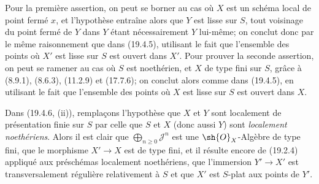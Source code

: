 Pour la première assertion, on peut se borner au cas où $X$ est un schéma local de point fermé $x$, et l'hypothèse entraîne alors que $Y$ est lisse sur $S$, tout voisinage du point fermé de $Y$ dans $Y$ étant nécessairement $Y$ lui-même; on conclut donc par le même raisonnement que dans (19.4.5), utilisant le fait que l'ensemble des points où $X'$ est lisse sur $S$ est ouvert dans $X'$. Pour prouver la seconde assertion, on peut se ramener au cas où $S$ est noethérien, et $X$ de type fini sur $S$, grâce à (8.9.1), (8.6.3), (11.2.9) et (17.7.6); on conclut alors comme dans (19.4.5), en utilisant le fait que l'ensemble des points où $X$ est lisse sur $S$ est ouvert dans $X$.

\begin{remark}[19.4.10]
\label{IV.19.4.10}
Dans (19.4.6, (ii)), remplaçons l'hypothèse que $X$ et $Y$ sont localement de présentation finie sur $S$ par celle que $S$ et $X$ (donc aussi $Y$) sont \emph{localement noethériens}. Alors il est clair que $\bigoplus_{n\geq0}\mathscr J^n$ est une $\sh{O}_X$-Algèbre de type fini, que le morphisme $X'\to X$ est de type fini, et il résulte encore de (19.2.4) appliqué aux préschémas localement noethériens, que l'immersion $Y'\to X'$ est transversalement régulière relativement à $S$ et que $X'$ est $S$-plat aux points de $Y'$.
\end{remark}

